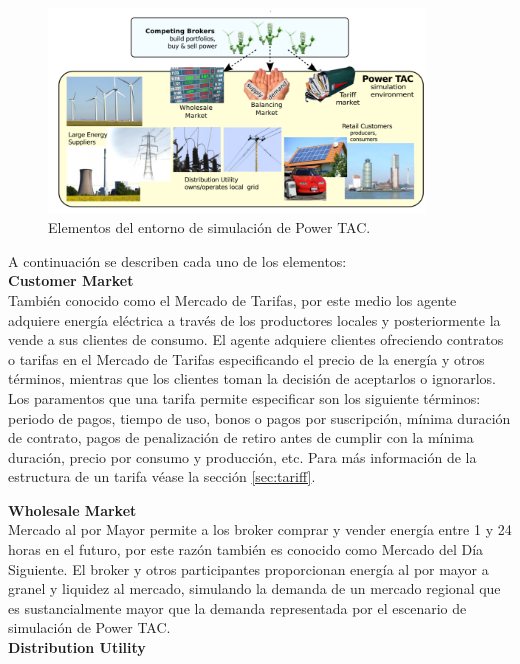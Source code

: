 \begin{figure}[!h]
	\centering
	\includegraphics[width=10cm]{img/entorno.png}
	\caption{Elementos del entorno de simulación de Power TAC.}
	\label{entorno}
\end{figure}

A continuación se describen cada uno de los elementos:\\

\textbf{Customer Market}\\

También conocido como el  Mercado de Tarifas, por este medio los agente adquiere energía eléctrica a través de los productores locales y posteriormente la vende a sus clientes de consumo. El agente adquiere clientes ofreciendo contratos o tarifas en el Mercado de Tarifas especificando el precio de la energía y otros términos, mientras que los clientes toman la decisión de aceptarlos o ignorarlos. 
Los paramentos que una tarifa permite especificar son los siguiente términos: periodo de pagos, tiempo de uso, bonos o pagos por suscripción, mínima duración de contrato, pagos de penalización de retiro antes de cumplir con la mínima duración, precio por consumo y producción, etc. Para más información  de la estructura de un tarifa véase la sección \ref{sec:tariff}.

\textbf{Wholesale Market}\\

Mercado al por Mayor permite a los broker comprar y vender energía entre 1 y 24 horas en el futuro, por este razón también es conocido como Mercado del Día Siguiente. El broker y otros participantes proporcionan energía al por mayor a granel y liquidez al mercado, simulando la demanda de un mercado regional que es sustancialmente mayor que la demanda representada por el escenario de simulación de Power TAC.\\

\textbf{Distribution Utility}\\

